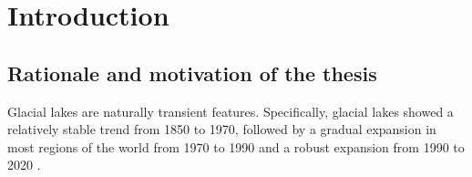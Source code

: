 \chapter{Introduction}
\label{ch:introduction}


\section{Rationale and motivation of the thesis}





Glacial lakes are naturally transient features. Specifically, glacial lakes showed a relatively stable trend from 1850 to 1970, followed by a gradual expansion in most regions of the world from 1970 to 1990 and a robust expansion from 1990 to 2020 \citep{Zhang&al2024}.





